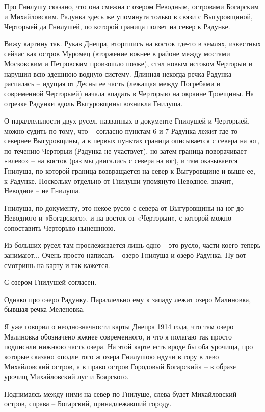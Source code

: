Про Гнилушу сказано, что она смежна с озером Неводным, островами Богарским и Михайловским. Радунка здесь же упомянута только в связи с Выгуровщиной, Черторыей да Гнилушей, по которой граница ползет на север к Радунке.

Вижу картину так. Рукав Днепра, вторгшись на восток где-то в землях, известных сейчас как остров Муромец (вторжение южнее в районе между мостами Московским и Петровским произошло позже), стал новым истоком Черторыи и нарушил всю здешнюю водную систему. Длинная некогда речка Радунка распалась – идущая от Десны ее часть (лежащая между Погребами и современной Черторыей) начала впадать в Черторыю на окраине Троещины. На отрезке Радунки вдоль Выгуровщины возникла Гнилуша.

О параллельности двух русел, названных в документе Гнилушей и Черторыей, можно судить по тому, что – согласно пунктам 6 и 7 Радунка лежит где-то севернее Выгуровщины, а в первых пунктах граница описывается с севера на юг, по течению Черторыи (Радунка не участвует), но затем граница поворачивает «влево» – на восток (раз мы двигались с севера на юг), и там оказывается Гнилуша, по которой граница возвращается на север к Выгуровщине и выше ее, к Радунке. Поскольку отдельно от Гнилуши упомянуто Неводное, значит, Неводное – не Гнилуша.

Гнилуша, по документу, это некое русло с севера от Выгуровщины на юг до Неводного и «Богарского», и на восток от «Черторыи», с которой можно сопоставить Черторыю нынешнюю.

Из больших русел там прослеживается лишь одно – это русло, части коего теперь занимают... Очень просто написать – озеро Гнилуша и озеро Радунка. Ну вот смотришь на карту и так кажется. 

С озером Гнилушей согласен. 

Однако про озеро Радунку. Параллельно ему к западу лежит озеро Малиновка, бывшая речка Меленовка.

Я уже говорил о неоднозначности карты Днепра 1914 года, что там озеро Малиновка обозначено южнее современного, и что я полагаю так просто подписали нижнюю часть озера. На этой карте есть вроде бы оба урочища, про которые сказано «подле того ж озера Гнилушою идучи в гору в лево Михайловский остров, а в право остров Городовый Богарский» – в образе урочищ Михайловский луг и Боярского.

Поднимаясь между ними на север по Гнилуше, слева будет Михайловский остров, справа – Богарский, принадлежавший городу.

